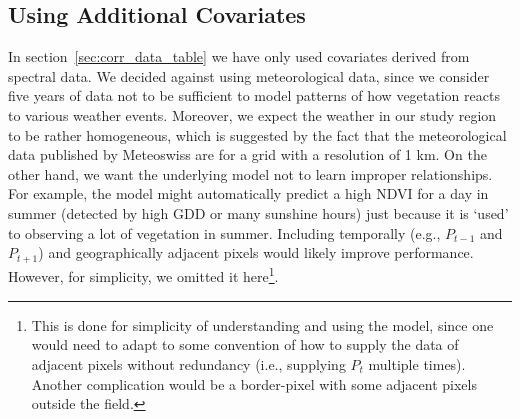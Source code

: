 {    \subsection{Using Additional Covariates}{
        In section~\ref{sec:corr_data_table} we have only used covariates derived from spectral data. 
        We decided against using meteorological data, since we consider five years of data not to be sufficient to model patterns of how vegetation reacts to various weather events. Moreover, we expect the weather in our study region to be rather homogeneous, which is suggested by the fact that the meteorological data published by Meteoswiss are for a grid with a resolution of 1 km. On the other hand, we want the underlying model not to learn improper relationships. For example, the model might automatically predict a high NDVI for a day in summer (detected by high GDD or many sunshine hours) just because it is `used' to observing a lot of vegetation in summer. 
        Including temporally (e.g., $P_{t-1}$ and $P_{t+1}$) and geographically adjacent pixels would likely improve performance. However, for simplicity, we omitted it here\footnote{This is done for simplicity of understanding and using the model, since one would need to adapt to some convention of how to supply the data of adjacent pixels without redundancy (i.e., supplying $P_t$ multiple times). Another complication would be a border-pixel with some adjacent pixels outside the field.}.
    }
}


